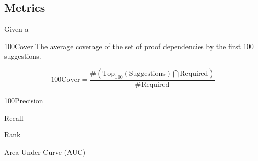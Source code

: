 \subsection{Metrics}
Given a


\begin{definition}{100Cover}
The average coverage of the set of proof dependencies by the first 100 suggestions.

\[ \text{100Cover} = \frac{ \#( \text{Top}_{100}(\text{Suggestions}) \bigcap \text{Required}) } { \#\text{Required} } \]
\end{definition}


\begin{definition}{100Precision}
\end{definition}

\begin{definition}{Recall}
\end{definition}

\begin{definition}{Rank}
\end{definition}

\begin{definition}{Area Under Curve (AUC)}
\end{definition}

